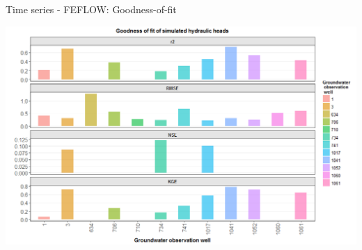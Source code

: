 \documentclass[8pt,ignorenonframetext,]{beamer}
\begin{document}
\begin{frame}{Time series - FEFLOW: Goodness-of-fit}

\includegraphics{imgPres/time_series_head_analysis04.png}

\end{frame}
\end{document}
